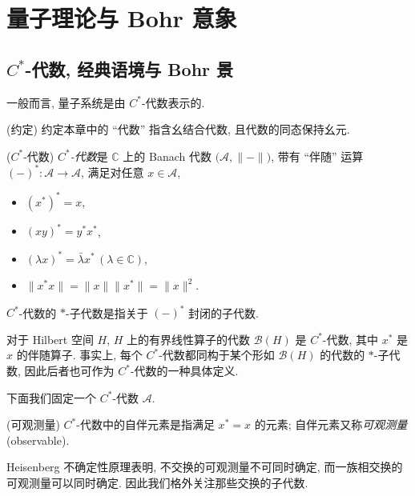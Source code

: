 \section{量子理论与 Bohr 意象}



\subsection{$C^*$-代数, 经典语境与 Bohr 景}

一般而言, 量子系统是由 $C^*$-代数表示的.

\begin{remark}
    {(约定)}
    约定本章中的 ``代数'' 指含幺结合代数, 且代数的同态保持幺元.
\end{remark}

\begin{definition}
    {($C^*$-代数)}
    \emph{$C^*$-代数}是 $\mathbb{C}$ 上的 Banach 代数 $\big(\mathcal A,\|{-}\|\big)$,
    带有 ``伴随'' 运算 $(-)^*\colon \mathcal A \to \mathcal A$,
    满足对任意 $x\in \mathcal A$,
    \begin{itemize}
        \item $(x^*)^*=x$,
        \item $(xy)^*=y^*x^*$,
        \item $(\lambda x)^*=\bar\lambda x^*\,(\lambda\in\mathbb{C})$,
        \item $\|x^* x\|=\|x\|\|x^*\|=\|x\|^2$.
    \end{itemize}
    $C^*$-代数的 $*$-子代数是指关于 $(-)^*$ 封闭的子代数.
\end{definition}

\begin{example}
    {}
    对于 Hilbert 空间 $H$, $H$ 上的有界线性算子的代数 $\mathcal B(H)$ 是 $C^*$-代数, 其中 $x^*$ 是 $x$ 的伴随算子. 事实上, 每个 $C^*$-代数都同构于某个形如 $\mathcal B(H)$ 的代数的 $*$-子代数, 因此后者也可作为 $C^*$-代数的一种具体定义.
\end{example}

下面我们固定一个 $C^*$-代数 $\mathcal A$.

\begin{definition}
    {(可观测量)}
    $C^*$-代数中的自伴元素是指满足 $x^*=x$ 的元素; 自伴元素又称\emph{可观测量} (observable).
\end{definition}

Heisenberg 不确定性原理表明, 不交换的可观测量不可同时确定, 而一族相交换的可观测量可以同时确定. 因此我们格外关注那些交换的子代数.

